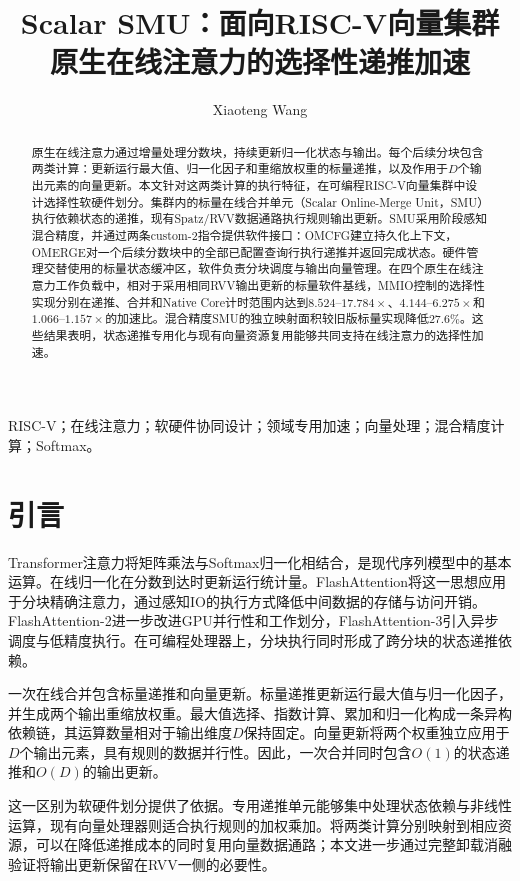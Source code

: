 \documentclass[journal]{IEEEtran}
\title{Scalar SMU：面向RISC-V向量集群原生在线注意力的选择性递推加速}
\author{Xiaoteng Wang}
\begin{document}
\maketitle
\raggedbottom
\begin{abstract}
原生在线注意力通过增量处理分数块，持续更新归一化状态与输出。每个后续分块包含两类计算：更新运行最大值、归一化因子和重缩放权重的标量递推，以及作用于$D$个输出元素的向量更新。本文针对这两类计算的执行特征，在可编程RISC-V向量集群中设计选择性软硬件划分。集群内的标量在线合并单元（Scalar Online-Merge Unit，SMU）执行依赖状态的递推，现有Spatz/RVV数据通路执行规则输出更新。SMU采用阶段感知混合精度，并通过两条custom-2指令提供软件接口：OMCFG建立持久化上下文，OMERGE对一个后续分数块中的全部已配置查询行执行递推并返回完成状态。硬件管理交替使用的标量状态缓冲区，软件负责分块调度与输出向量管理。在四个原生在线注意力工作负载中，相对于采用相同RVV输出更新的标量软件基线，MMIO控制的选择性实现分别在递推、合并和Native Core计时范围内达到$8.524$--$17.784\times$、$4.144$--$6.275\times$和$1.066$--$1.157\times$的加速比。混合精度SMU的独立映射面积较旧版标量实现降低$27.6\%$。这些结果表明，状态递推专用化与现有向量资源复用能够共同支持在线注意力的选择性加速。
\end{abstract}
\begin{IEEEkeywords}
RISC-V；在线注意力；软硬件协同设计；领域专用加速；向量处理；混合精度计算；Softmax。
\end{IEEEkeywords}

\section{引言}
Transformer注意力将矩阵乘法与Softmax归一化相结合，是现代序列模型中的基本运算\cite{ref1}。在线归一化在分数到达时更新运行统计量\cite{ref2}。FlashAttention将这一思想应用于分块精确注意力，通过感知IO的执行方式降低中间数据的存储与访问开销\cite{ref3}。FlashAttention-2进一步改进GPU并行性和工作划分\cite{ref4}，FlashAttention-3引入异步调度与低精度执行\cite{ref5}。在可编程处理器上，分块执行同时形成了跨分块的状态递推依赖。

一次在线合并包含标量递推和向量更新。标量递推更新运行最大值与归一化因子，并生成两个输出重缩放权重。最大值选择、指数计算、累加和归一化构成一条异构依赖链，其运算数量相对于输出维度$D$保持固定。向量更新将两个权重独立应用于$D$个输出元素，具有规则的数据并行性。因此，一次合并同时包含$O(1)$的状态递推和$O(D)$的输出更新。

这一区别为软硬件划分提供了依据。专用递推单元能够集中处理状态依赖与非线性运算，现有向量处理器则适合执行规则的加权乘加。将两类计算分别映射到相应资源，可以在降低递推成本的同时复用向量数据通路；本文进一步通过完整卸载消融验证将输出更新保留在RVV一侧的必要性。
\end{document}
